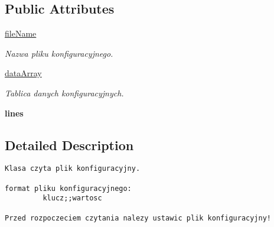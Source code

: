 \subsection*{Public Attributes}
\begin{CompactItemize}
\item 
\hypertarget{class_serv_1_1_config_reader_1_1_config_reader_3d369f91bd609f90e8eead22a7c829e0}{
\hyperlink{class_serv_1_1_config_reader_1_1_config_reader_3d369f91bd609f90e8eead22a7c829e0}{fileName}}
\label{class_serv_1_1_config_reader_1_1_config_reader_3d369f91bd609f90e8eead22a7c829e0}

\begin{CompactList}\small\item\em Nazwa pliku konfiguracyjnego. \item\end{CompactList}\item 
\hypertarget{class_serv_1_1_config_reader_1_1_config_reader_cf1f5f01f97b0d27a74c5466cf917a20}{
\hyperlink{class_serv_1_1_config_reader_1_1_config_reader_cf1f5f01f97b0d27a74c5466cf917a20}{dataArray}}
\label{class_serv_1_1_config_reader_1_1_config_reader_cf1f5f01f97b0d27a74c5466cf917a20}

\begin{CompactList}\small\item\em Tablica danych konfiguracyjnych. \item\end{CompactList}\item 
\hypertarget{class_serv_1_1_config_reader_1_1_config_reader_2bc23c7436c3b44766cca7db8a1674a0}{
\textbf{lines}}
\label{class_serv_1_1_config_reader_1_1_config_reader_2bc23c7436c3b44766cca7db8a1674a0}

\end{CompactItemize}


\subsection{Detailed Description}


\footnotesize\begin{verbatim}
Klasa czyta plik konfiguracyjny.

format pliku konfiguracyjnego: 
         klucz;;wartosc         

Przed rozpoczeciem czytania nalezy ustawic plik konfiguracyjny!    
\end{verbatim}
\normalsize
 

